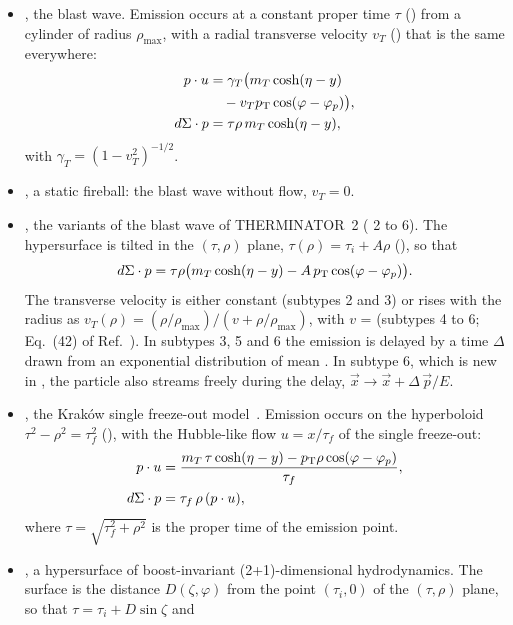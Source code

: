 \begin{itemize}
  \item {}, the blast wave. Emission occurs at a constant proper time $\tau$ () from a cylinder of radius
  $\rho_{\max}$, with a radial transverse velocity $v_T$ () that is the same everywhere:
  \begin{align}
    p\cdot u & = \gamma_T\bigl(m_T\cosh(\eta-y) \nonumber\\ & \quad - v_Tp_{\mathrm{T}}\cos(\varphi-\varphi_p)\bigr), \\
    d\Sigma\cdot p & = \tau\rho\, m_T\cosh(\eta-y),
  \end{align}
  with $\gamma_T = (1-v_T^2)^{-1/2}$.
  \item {}, a static fireball: the blast wave without flow, $v_T = 0$.
  \item {}, the variants of the blast wave of THERMINATOR~2 ( 2 to 6). The hypersurface is tilted
  in the $(\tau,\rho)$ plane, $\tau(\rho) = \tau_i + A\rho$ (), so that
  \begin{equation}
    d\Sigma\cdot p = \tau\rho\bigl(m_T\cosh(\eta-y) - A\,p_{\mathrm{T}}\cos(\varphi-\varphi_p)\bigr).
  \end{equation}
  The transverse velocity is either constant (subtypes 2 and 3) or rises with the radius as
  $v_T(\rho) = (\rho/\rho_{\max})/(v + \rho/\rho_{\max})$, with $v$ =  (subtypes 4 to 6; Eq.~(42) of
  Ref.~\cite{Chojnacki:2011hb}). In subtypes 3, 5 and 6 the emission is delayed by a time $\Delta$ drawn from an
  exponential distribution of mean . In subtype 6, which is new in \Datum{}, the particle also streams
  freely during the delay, $\vec{x} \to \vec{x} + \Delta\,\vec{p}/E$.
  \item {}, the Krak\'ow single freeze-out model~\cite{Broniowski:2001we}. Emission occurs on the hyperboloid
  $\tau^2 - \rho^2 = \tau_f^2$ (), with the Hubble-like flow $u = x/\tau_f$ of the single freeze-out:
  \begin{align}
    p\cdot u & = \frac{m_T\,\tau\cosh(\eta-y) - p_{\mathrm{T}}\rho\cos(\varphi-\varphi_p)}{\tau_f}, \\
    d\Sigma\cdot p & = \tau_f\,\rho\,(p\cdot u),
  \end{align}
  where $\tau = \sqrt{\tau_f^2+\rho^2}$ is the proper time of the emission point.
  \item {}, a hypersurface of boost-invariant (2+1)-dimensional hydrodynamics. The surface is the distance
  $D(\zeta,\varphi)$ from the point $(\tau_i, 0)$ of the $(\tau,\rho)$ plane, so that $\tau = \tau_i + D\sin\zeta$ and

\end{itemize}
